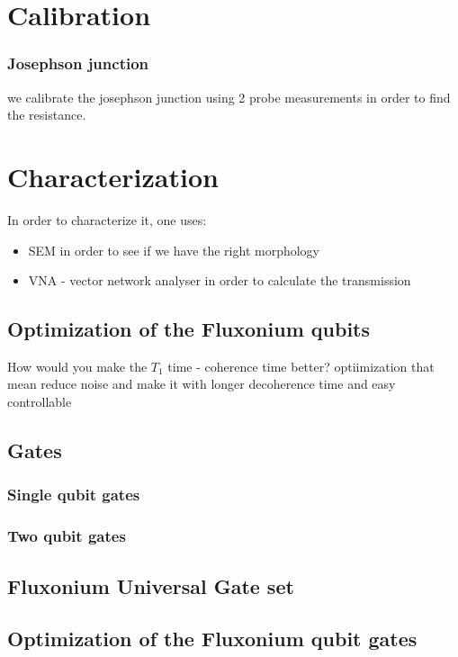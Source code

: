 
\chapter{Calibration}
\subsection{Josephson junction}
we calibrate the josephson junction using 2 probe measurements in order to find the resistance. 


\chapter{Characterization}
    In order to characterize it, one uses: 
\begin{itemize}
    \item SEM  in order to see if we have the right morphology
    \item VNA - vector network analyser in order to calculate the transmission
\end{itemize}

\section{Optimization of the Fluxonium qubits}
How would you make the $T_1$ time - coherence time better? 
optiimization that mean reduce noise and make it with longer decoherence time and easy controllable

\section{Gates}

\subsection{Single qubit gates}

\subsection{Two qubit gates}

\section{Fluxonium Universal Gate set}

\section{Optimization of the Fluxonium qubit gates}